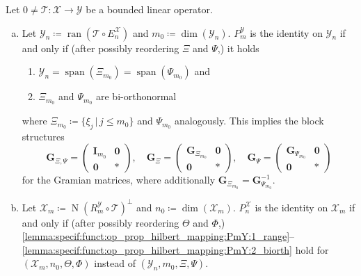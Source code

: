 \documentclass[a4paper]{paper}
\newcommand*{\SPC}[1]{{\ensuremath{\mathscr{#1}}}}
\newcommand*{\SPCX}{\SPC{X}}
\newcommand*{\SPCY}{\SPC{Y}}
\newcommand*{\OP}[1]{{\ensuremath{\mathcal{#1}}}}
\newcommand*{\OPT}{\OP{T}}
\newcommand*{\EXT}[2]{\ensuremath{E_{#1}^{#2}}}
\newcommand*{\REST}[2]{\ensuremath{R_{#1}^{#2}}}
\newcommand*{\PROJ}[2]{\ensuremath{P_{#1}^{#2}}}
\newcommand*{\RmY}{{\ensuremath{\REST{m}{\SPC{Y}}}}}
\newcommand*{\EnX}{{\ensuremath{\EXT{n}{\SPC{X}}}}}
\newcommand*{\PnX}{{\ensuremath{\PROJ{n}{\SPCX}}}}
\newcommand*{\PmY}{{\ensuremath{\PROJ{m}{\SPCY}}}}
\DeclareMathOperator{\RANGE}{{ran}}
\DeclareMathOperator{\NULL}{{N}}
\DeclareMathOperator{\SPAN}{{span}}
\DeclareMathOperator{\DIM}{{dim}}
\DeclareMathOperator{\DEFEQ}{{\coloneqq}}
\newcommand*{\BDZERO}{\boldsymbol{0}}
\newcommand*{\BDG}{\boldsymbol{G}}
\newcommand*{\BDI}{\boldsymbol{I}}
\begin{document}
\begin{lemma}
 \label{lemma:specif:funct:op_prop_hilbert_mapping}
 Let $0 \neq \OPT\colon \SPCX \to \SPCY$ be a bounded linear operator. 
 
 \begin{enumerate}[(a)]
  \item \label{lemma:specif:funct:op_prop_hilbert_mapping:PmY}
  Let $\SPCY_n \DEFEQ  \RANGE(\OPT \circ \EnX)$ and $m_0 \DEFEQ  \DIM(\SPCY_n)$. $\PmY$ is the identity on 
  $\SPCY_n$ if and only if (after possibly reordering $\Xi$ and $\Psi$,) it holds
  \begin{enumerate}[({a}1)]
   \item \label{lemma:specif:funct:op_prop_hilbert_mapping:PmY:1_range}
   $\SPCY_n = \SPAN(\Xi_{m_0}) = \SPAN(\Psi_{m_0})$ and
   \item \label{lemma:specif:funct:op_prop_hilbert_mapping:PmY:2_biorth}
   $\Xi_{m_0}$ and $\Psi_{m_0}$ are bi-orthonormal
  \end{enumerate}
  where $\Xi_{m_0} \DEFEQ  \{ \xi_j\, |\, j\leq m_0 \}$ and $\Psi_{m_0}$ analogously. This implies the block 
  structures
  \renewcommand{\arraystretch}{1.1}
  \begin{equation*}
   \BDG_{\Xi, \Psi} =
   \left(
   \begin{array}{c|c}
    \BDI_{m_0} & \BDZERO \\[2pt]
    \hline
    \BDZERO & \boldsymbol{\ast}
   \end{array}
   \right),
   \quad
   \BDG_\Xi =
   \left(
   \begin{array}{c|c}
    \BDG_{\Xi_{m_0}} & \BDZERO \\[2pt]
    \hline
    \BDZERO & \boldsymbol{\ast}
   \end{array}
   \right),
   \quad
   \BDG_\Psi =
   \left(
   \begin{array}{c|c}
    \BDG_{\Psi_{m_0}} & \BDZERO \\[2pt]
    \hline
    \BDZERO & \boldsymbol{\ast}
   \end{array}
   \right)
  \end{equation*}
  \renewcommand{\arraystretch}{1.0}
  for the Gramian matrices, where additionally $\BDG_{\Xi_{m_0}} = \BDG_{\Psi_{m_0}}^{-1}$. 

  \item \label{lemma:specif:funct:op_prop_hilbert_mapping:PnX}
  Let $\SPCX_m \DEFEQ  \NULL(\RmY \circ \OPT)^\perp$ and $n_0 \DEFEQ  \DIM(\SPCX_m)$. $\PnX$ is the identity on   
  $\SPCX_m$ if and only if (after possibly reordering $\Theta$ and $\Phi$,)
  \eqref{lemma:specif:funct:op_prop_hilbert_mapping:PmY:1_range}--%
  \eqref{lemma:specif:funct:op_prop_hilbert_mapping:PmY:2_biorth}
  hold for $(\SPCX_m, n_0, \Theta, \Phi)$ instead of $(\SPCY_n, m_0, \Xi, \Psi)$.
 \end{enumerate}

\end{lemma}
\vspace{1em}
\end{document}

